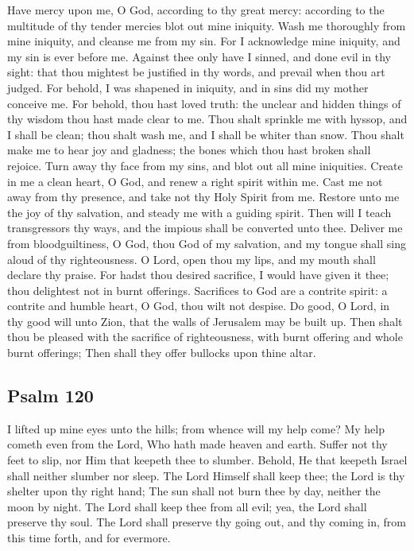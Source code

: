 Have mercy upon me, O God, according to thy great mercy: according to the multitude of thy tender mercies blot out mine iniquity. Wash me thoroughly from mine iniquity, and cleanse me from my sin. For I acknowledge mine iniquity, and my sin is ever before me. Against thee only have I sinned, and done evil in thy sight: that thou mightest be justified in thy words, and prevail when thou art judged. For behold, I was shapened in iniquity, and in sins did my mother conceive me.  For behold, thou hast loved truth: the unclear and hidden things of thy wisdom thou hast made clear to me. Thou shalt sprinkle me with hyssop, and I shall be clean; thou shalt wash me, and I shall be whiter than snow. Thou shalt make me to hear joy and gladness; the bones which thou hast broken shall rejoice. Turn away thy face from my sins, and blot out all mine iniquities. Create in me a clean heart, O God, and renew a right spirit within me. Cast me not away from thy presence, and take not thy Holy Spirit from me. Restore unto me the joy of thy salvation, and steady me with a guiding spirit.  Then will I teach transgressors thy ways, and the impious shall be converted unto thee. Deliver me from bloodguiltiness, O God, thou God of my salvation, and my tongue shall sing aloud of thy righteousness. O Lord, open thou my lips, and my mouth shall declare thy praise. For hadst thou desired sacrifice, I would have given it thee; thou delightest not in burnt offerings. Sacrifices to God are a contrite spirit: a contrite and humble heart, O God, thou wilt not despise. Do good, O Lord, in thy good will unto Zion, that the walls of Jerusalem may be built up. Then shalt thou be pleased with the sacrifice of righteousness, with burnt offering and whole burnt offerings; Then shall they offer bullocks upon thine altar.

\subsection{Psalm 120}

I lifted up mine eyes unto the hills; from whence will my help come? My help cometh even from the Lord, Who hath made heaven and earth. Suffer not thy feet to slip, nor Him that keepeth thee to slumber. Behold, He that keepeth Israel shall neither slumber nor sleep. The Lord Himself shall keep thee; the Lord is thy shelter upon thy right hand; The sun shall not burn thee by day, neither the moon by night. The Lord shall keep thee from all evil; yea, the Lord shall preserve thy soul. The Lord shall preserve thy going out, and thy coming in, from this time forth, and for evermore.


